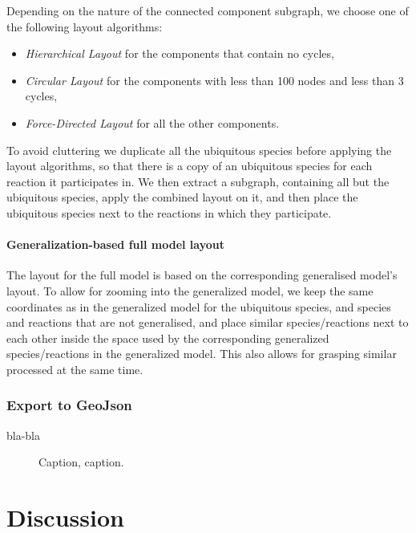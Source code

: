 \documentclass{bioinfo}
\begin{document}
\begin{methods}
Depending on the nature of the connected component subgraph, we choose one of the following layout algorithms:
\begin{itemize}
\item \emph{Hierarchical Layout} for the components that contain no cycles,
\item \emph{Circular Layout} for the components with less than 100 nodes and less than 3 cycles,
\item \emph{Force-Directed Layout} for all the other components.
\end{itemize}

To avoid cluttering we duplicate all the ubiquitous species before applying the layout algorithms, so that there is a copy of an ubiquitous species for each reaction it participates in. We then extract a subgraph, containing all but the ubiquitous species, apply the combined layout on it, and then place the ubiquitous species next to the reactions in which they participate.

\paragraph*{Generalization-based full model layout}
The layout for the full model is based on the corresponding generalised model's layout. To allow for zooming into the generalized model, we keep the same coordinates as in the generalized model for the ubiquitous species, and species and reactions that are not generalised, and place similar species/reactions next to each other inside the space used by the corresponding generalized species/reactions in the generalized model. This also allows for grasping similar processed at the same time. 
 
\subsubsection*{Export to GeoJson}

bla-bla



\end{methods}

\begin{figure}[!tpb]%
\caption{Caption, caption.}\label{fig:01}
\end{figure}

\section{Discussion}
\end{document}
